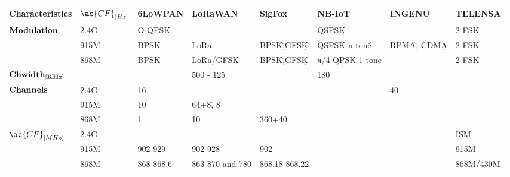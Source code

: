 \begin{longtable}{l|l|l|l|l|l|l|l}
	\bf{Characteristics}                 & $\ac{CF}_{[Hz]}$ & \bf{6LoWPAN} & \bf{LoRaWAN}           & \bf{SigFox}   & \bf{NB-IoT}                            & \textbf{INGENU}   & \textbf{TELENSA}\\\hline
	\multirow{3}{*}{$\bf{Modulation}$}   & 2.4G             & O-QPSK       & -                      & -             & QSPSK\d                                &                   & 2-FSK           \\
	\                                    & 915M             & BPSK         & LoRa                   & BPSK\u,GFSK\d & QSPSK n-tone\u                     & RPMA\u,	CDMA\d    & 2-FSK           \\
	\                                    & 868M             & BPSK         & LoRa/GFSK              & BPSK\u,GFSK\d & π/4-QPSK 1-tone					 &                   & 2-FSK           \\\hline
	$\bf{Ch width_{[KHz]}}$              &                  &              & 500 - 125              &               & 180                                    &                   & \\
	\multirow{3}{*}{$\bf{Channels}$}     & 2.4G             & 16           & -                      & -             & -                                      & 40                & \ko             \\
	\                                    & 915M             & 10           & 64+8\u, 8\d            & \ko           & \ko                                    & \ko               & \ko             \\
	\                                    & 868M             & 1            & 10                     & 360+40        & \ko                                    & \ko               & \ko             \\\hline
	\multirow{2}{*}{$\ac{CF}_{[MHz]}$}   & 2.4G             & \ko          & -                      & -             & -                                      & \ko               & ISM             \\
	\                                    & 915M             & 902-929      & 902-928                & 902           & \ko                                    & \ko               & 915M            \\
	\                                    & 868M             & 868-868.6    & 863-870 and 780        & 868.18-868.22 & \ko                                    & \ko               & 868M/430M       \\\hline

\end{longtable}
